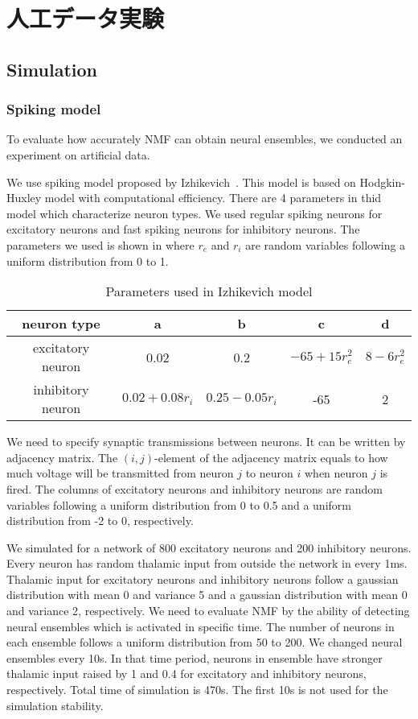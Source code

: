 \chapter{人工データ実験}
\section{Simulation}
\subsection{Spiking model}
To evaluate how accurately NMF can obtain neural ensembles, we conducted an experiment on artificial data.

We use spiking model proposed by Izhikevich~\cite{Izhikevich2003}.
This model is based on Hodgkin-Huxley model with computational efficiency.
There are 4 parameters in thid model which characterize neuron types.
We used regular spiking neurons for excitatory neurons and fast spiking neurons for inhibitory neurons.
The parameters we used is shown in  where $r_e$ and $r_i$ are random variables following a uniform distribution from 0 to 1.

\begin{table}[htb]
  \center
  \begin{tabular}{|c|cccc|} \hline
    neuron type & a & b & c & d \\ \hline
    excitatory neuron & 0.02 & 0.2 & $-65 + 15 r_e^2$ & $8 - 6r_e^2$ \\
    inhibitory neuron & $0.02 + 0.08r_i$ & $0.25 - 0.05 r_i$ & -65 & 2 \\ \hline
  \end{tabular}
  \caption{Parameters used in Izhikevich model}
  \label{tab:parameter1}
\end{table}

We need to specify synaptic transmissions between neurons.
It can be written by adjacency matrix.
The $(i,j)$-element of the adjacency matrix equals to how much voltage will be transmitted from neuron $j$ to neuron $i$ when neuron $j$ is fired.
The columns of excitatory neurons and inhibitory neurons are random variables following a uniform distribution from 0 to 0.5 and a uniform distribution from -2 to 0, respectively.

We simulated for a network of 800 excitatory neurons and 200 inhibitory neurons.
Every neuron has random thalamic input from outside the network in every 1ms.
Thalamic input for excitatory neurons and inhibitory neurons follow a gaussian distribution with mean 0 and variance 5 and a gaussian distribution with mean 0 and variance 2, respectively.
We need to evaluate NMF by the ability of detecting neural ensembles which is activated in specific time.
The number of neurons in each ensemble follows a uniform distribution from 50 to 200.
We changed neural ensembles every 10s.
In that time period, neurons in ensemble have stronger thalamic input raised by 1 and 0.4 for excitatory and inhibitory neurons, respectively.
Total time of simulation is 470s.
The first 10s is not used for the simulation stability.


